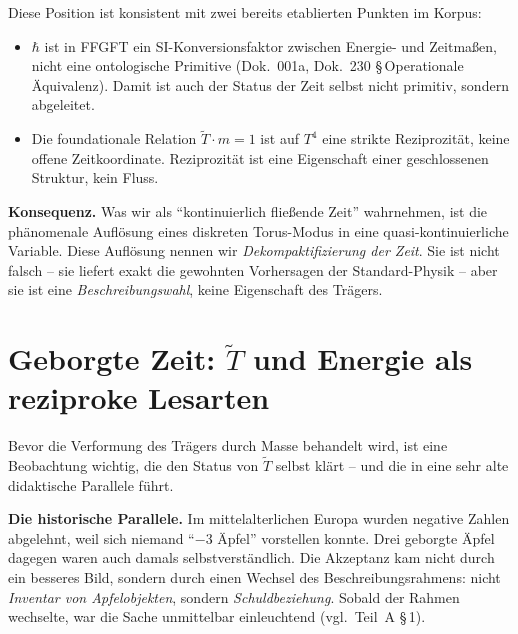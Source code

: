 Diese Position ist konsistent mit zwei bereits etablierten Punkten
im Korpus:

\begin{itemize}[leftmargin=2em,itemsep=4pt,topsep=4pt]
  \item $\hbar$ ist in FFGFT ein SI-Konversionsfaktor zwischen
        Energie- und Zeitmaßen, nicht eine ontologische Primitive
        (Dok.~001a, Dok.~230 §\,Operationale Äquivalenz). Damit
        ist auch der Status der Zeit selbst nicht primitiv,
        sondern abgeleitet.
  \item Die foundationale Relation $\tilde T \cdot m = 1$ ist auf
        $T^4$ eine strikte Reziprozität, keine offene
        Zeitkoordinate. Reziprozität ist eine Eigenschaft einer
        geschlossenen Struktur, kein Fluss.
\end{itemize}

\textbf{Konsequenz.} Was wir als \enquote{kontinuierlich fließende Zeit}
wahrnehmen, ist die phänomenale Auflösung eines diskreten
Torus-Modus in eine quasi-kontinuierliche Variable. Diese Auflösung
nennen wir \emph{Dekompaktifizierung der Zeit}. Sie ist nicht falsch
-- sie liefert exakt die gewohnten Vorhersagen der Standard-Physik
-- aber sie ist eine \emph{Beschreibungswahl}, keine Eigenschaft des
Trägers.

\section{Geborgte Zeit: $\tilde T$ und Energie als reziproke Lesarten}

Bevor die Verformung des Trägers durch Masse behandelt wird, ist eine
Beobachtung wichtig, die den Status von $\tilde T$ selbst klärt -- und
die in eine sehr alte didaktische Parallele führt.

\textbf{Die historische Parallele.} Im mittelalterlichen Europa wurden
negative Zahlen abgelehnt, weil sich niemand \enquote{$-3$ Äpfel}
vorstellen konnte. Drei geborgte Äpfel dagegen waren auch damals
selbstverständlich. Die Akzeptanz kam nicht durch ein besseres Bild,
sondern durch einen Wechsel des Beschreibungsrahmens: nicht
\emph{Inventar von Apfelobjekten}, sondern \emph{Schuldbeziehung}.
Sobald der Rahmen wechselte, war die Sache unmittelbar einleuchtend
(vgl.\ Teil~A §\,1).

